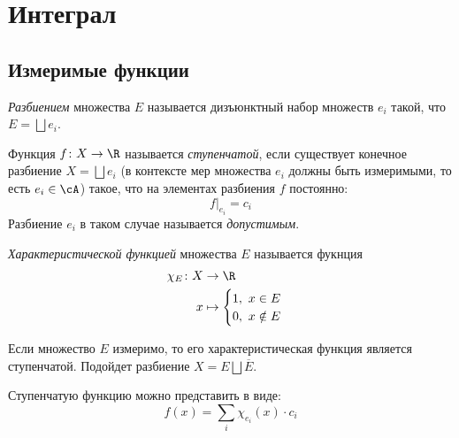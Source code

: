 \chapter{Интеграл}

\section{Измеримые функции}

\begin{definition}
	\textit{Разбиением} множества $E$ называется дизъюнктный набор множеств
	$e_i$ такой, что $E = \bigsqcup{e_i}$.
\end{definition}

\begin{definition}
	Функция $f\colon X \to \R$ называется \textit{ступенчатой}, 
	если существует конечное разбиение $X = \bigsqcup{e_i}$ (в контексте 
	мер множества $e_i$ должны быть измеримыми, то есть $e_i \in \cA$) такое,
	что на элементах разбиения $f$ постоянно:
\[
	f\big|_{e_i} = c_i
\]
	Разбиение $e_i$ в таком случае называется \textit{допустимым}.
\end{definition}

\begin{definition}
	\textit{Характеристической функцией} множества $E$ называется 
	фукнция
\begin{align*}
	\chi_E \colon X &\to \R \\
	x &\mapsto \begin{cases}
		1,~ x \in E \\
		0,~ x \notin E
	\end{cases}
\end{align*}
\end{definition}

\begin{remark}
	Если множество $E$ измеримо, то его характеристическая функция 
	является ступенчатой. Подойдет разбиение $X = E \bigsqcup \overline{E}$.
\end{remark}

\begin{remark}
	Ступенчатую функцию можно представить в виде:
\[
	f(x) = \sum_{i}{\chi_{e_i}(x) \cdot c_i}
\]
\end{remark}

